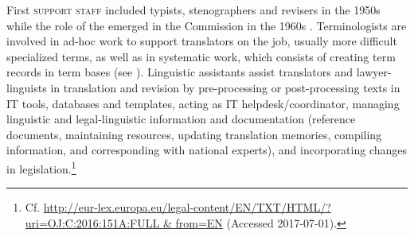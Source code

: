 \documentclass[output=paper]{langsci/langscibook}
\begin{document}
\largerpage[-1]
First \textsc{support staff} included typists, stenographers and revisers in the 1950s while the role of the  emerged in the Commission in the 1960s \citep[12, 21]{European2010}. Terminologists are involved in ad-hoc  work to support translators on the job, usually more difficult specialized terms, as well as in systematic  work, which consists of creating term records in term bases (see ). Linguistic assistants assist translators and lawyer-linguists in translation and revision by pre-processing or post-processing texts in IT tools, databases and templates, acting as IT helpdesk/coordinator, managing linguistic and legal-linguistic information and documentation (reference documents, maintaining resources, updating translation memories, compiling information, and corresponding with national experts), and incorporating changes in legislation.\footnote{Cf. \url{http://eur-lex.europa.eu/legal-content/EN/TXT/HTML/?uri=OJ:C:2016:151A:FULL & from=EN} (Accessed 2017-07-01).}
\end{document}
